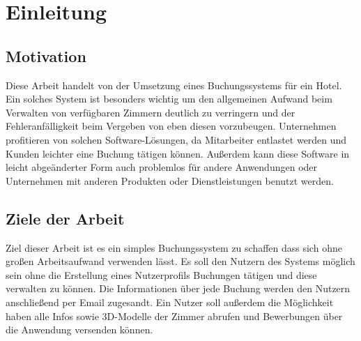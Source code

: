 \chapter{Einleitung}
\section{Motivation}
Diese Arbeit handelt von der Umsetzung eines Buchungssystems für ein Hotel. Ein solches System ist besonders wichtig um den allgemeinen Aufwand beim Verwalten von verfügbaren Zimmern deutlich zu verringern und der Fehleranfälligkeit beim Vergeben von eben diesen vorzubeugen. Unternehmen profitieren von solchen Software-Lösungen, da Mitarbeiter entlastet werden und Kunden leichter eine Buchung tätigen können. Außerdem kann diese Software in leicht abgeänderter Form auch problemlos für andere Anwendungen oder Unternehmen mit anderen Produkten oder Dienstleistungen benutzt werden.


\section{Ziele der Arbeit}
Ziel dieser Arbeit ist es ein simples Buchungssystem zu schaffen dass sich ohne großen Arbeitsaufwand verwenden lässt. Es soll den Nutzern des Systems möglich sein ohne die Erstellung eines Nutzerprofils Buchungen tätigen und diese verwalten zu können. Die Informationen über jede Buchung werden den Nutzern anschließend per Email zugesandt. Ein Nutzer soll außerdem die Möglichkeit haben alle Infos sowie 3D-Modelle der Zimmer abrufen und Bewerbungen über die Anwendung versenden können.